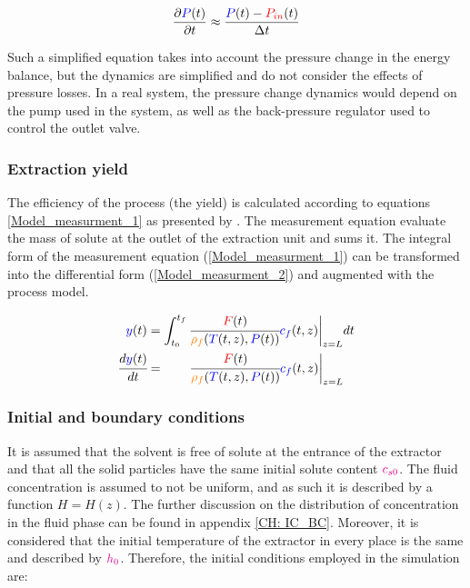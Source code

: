 \documentclass[../Article_Model_Parameters.tex]{subfiles}
\begin{document}
		{\footnotesize
			\begin{equation}
				\frac{\partial {\color{blue}P}(t)}{\partial t} \approx \frac{{\color{blue}P}(t) - {\color{red}P_{in}}(t) }{\Delta t}
		\end{equation}}
		
		Such a simplified equation takes into account the pressure change in the energy balance, but the dynamics are simplified and do not consider the effects of pressure losses. In a real system, the pressure change dynamics would depend on the pump used in the system, as well as the back-pressure regulator used to control the outlet valve.
  
		\subsubsection{Extraction yield} \label{CH: Yield}
			
		The efficiency of the process (the yield) is calculated according to equations \ref{Model_measurment_1} as presented by \citet{Sovova1994a}. The measurement equation evaluate the mass of solute at the outlet of the extraction unit and sums it. The integral form of the measurement equation (\ref{Model_measurment_1}) can be transformed into the differential form (\ref{Model_measurment_2}) and augmented with the process model.
			
		{\footnotesize
			\begin{align} 
				\label{Model_measurment_1}
				{\color{blue}y}(t) &= \int_{t_0}^{t_f} \cfrac{{\color{red}F}(t)}{{\color{orange}\rho_f}({\color{blue}T}(t,z),{\color{blue}P}(t))} {\color{blue}c_f}(t,z) \biggr\rvert_{z=L} dt \\
				\cfrac{d{\color{blue}y}(t)}{dt} &= \qquad \cfrac{{\color{red}F}(t)}{{\color{orange}\rho_f}({\color{blue}T}(t,z),{\color{blue}P}(t))} {\color{blue}c_f}(t,z) \biggr\rvert_{z=L} 
                \label{Model_measurment_2}
		\end{align}	}
  
		\subsubsection{Initial and boundary conditions} 
		It is assumed that the solvent is free of solute at the entrance of the extractor and that all the solid particles have the same initial solute content ${\color{magenta}c_{s0}}$. The fluid concentration is assumed to not be uniform, and as such it is described by a function $H=H(z)$. The further discussion on the distribution of concentration in the fluid phase can be found in appendix \ref{CH: IC_BC}. Moreover, it is considered that the initial temperature of the extractor in every place is the same and described by ${\color{magenta}h_0}$. Therefore, the initial conditions employed in the simulation are:
			
\end{document}
